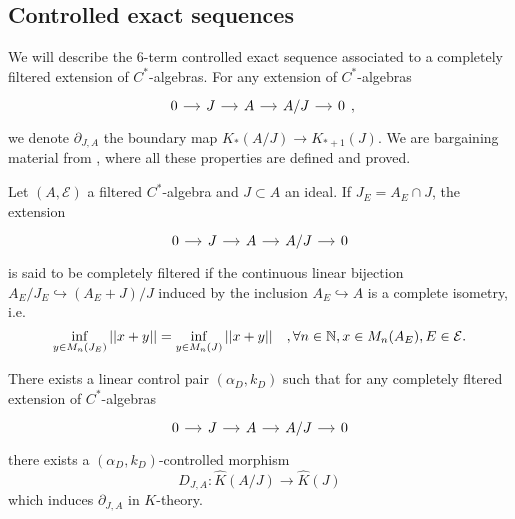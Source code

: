 \subsection{Controlled exact sequences}
We will describe the $6$-term controlled exact sequence associated to a completely filtered extension of $C^*$-algebras. For any extension of $C^*$-algebras 
\[\begin{tikzcd}[column sep = small]0\arrow{r} & J\arrow{r} & A\arrow{r} & A/J\arrow{r} & 0 \end{tikzcd},\]
we denote $\partial_{J,A}$ the boundary map $K_*(A/J)\rightarrow K_{*+1}(J)$. We are bargaining material from \cite{OY2}, where all these properties are defined and proved.\\

\begin{definition}
Let $(A,\mathcal E)$ a filtered $C^*$-algebra and $J\subset A$ an ideal. If $J_E = A_E\cap J$, the extension
\[\begin{tikzcd}[column sep = small]0\arrow{r} & J\arrow{r} & A\arrow{r} & A/J\arrow{r} & 0 \end{tikzcd}\]
is said to be completely filtered if the continuous linear bijection $A_E/J_E \hookrightarrow (A_E+J)/J$ induced by the inclusion $A_E\hookrightarrow A$ is a complete isometry, i.e.
\[ \inf_{y\in M_n(J_E)} ||x+y|| = \inf_{y\in M_n(J)} ||x+y||\quad,\forall n\in \mathbb N,x\in M_n(A_E),E\in \mathcal E.\]
\end{definition}

\begin{prop}
There exists a linear control pair $(\alpha_D,k_D)$ such that for any completely fltered extension of $C^*$-algebras
\[\begin{tikzcd}[column sep = small]0\arrow{r} & J\arrow{r} & A\arrow{r} & A/J\arrow{r} & 0 \end{tikzcd}\]
there exists a $(\alpha_D,k_D)$-controlled morphism 
\[D_{J,A} : \hat K(A/J)\rightarrow \hat K(J)\]
which induces $\partial_{J,A}$ in $K$-theory.
\end{prop}


